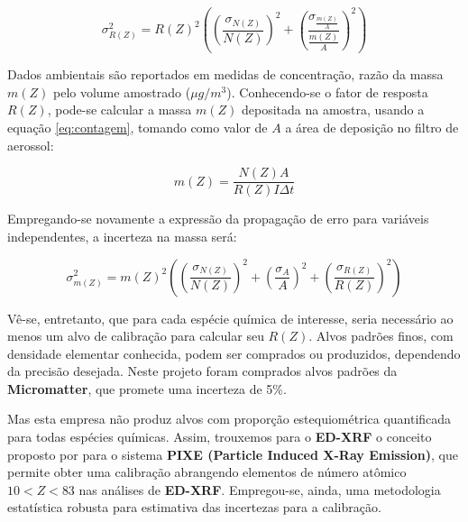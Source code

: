 \begin{equation}
  \label{eq:erro_fator_de_resposta}
  \sigma_{R(Z)}^2 = {R(Z)}^2 \left( \left(\frac{\sigma_{N(Z)}}{N(Z)}\right)^2 + 
                                  \left(\frac{\sigma_\frac{m(Z)}{A}}{\frac{m(Z)}{A}}\right)^2 
                             \right)
\end{equation}

Dados ambientais são reportados em medidas de concentração,
razão da massa $m(Z)$ pelo volume amostrado ($\mu g/m^3$).
Conhecendo-se o fator de resposta $R(Z)$, pode-se calcular a massa $m(Z)$ depositada na amostra, usando a equação \ref{eq:contagem}, tomando como valor de $A$ a área de deposição no filtro de aerossol: 

\begin{equation}
  \label{eq:xrfedmassa}
  m(Z) = \frac{N(Z) A}{ R(Z)I \Delta t}
\end{equation}

Empregando-se novamente a expressão da propagação de erro para variáveis independentes, 
a incerteza na massa será:

\begin{equation}
  \label{eq:erro_massa}
  \sigma_{m(Z)}^2 = {m(Z)}^2 \left( \left(\frac{\sigma_{N(Z)}}{N(Z)}\right)^2 + 
                                  \left(\frac{\sigma_A}{A}\right)^2 + 
                                  \left(\frac{\sigma_{R(Z)}}{R(Z)}\right)^2 
                             \right)
\end{equation}


Vê-se, entretanto, que para cada espécie química de interesse, seria necessário ao menos um alvo de calibração para calcular seu $R(Z)$. Alvos padrões finos, com densidade elementar conhecida, podem ser comprados ou produzidos, dependendo da precisão desejada. Neste projeto foram comprados alvos padrões da \textbf{Micromatter}, que promete uma incerteza de 5\%.

Mas esta empresa não produz alvos com proporção estequiométrica quantificada para todas espécies químicas.%
%
%
 Assim, trouxemos para o \textbf{ED-XRF} o conceito proposto por \citep{tabacniks2000}
para o sistema \textbf{PIXE (Particle Induced X-Ray Emission)}, que permite obter uma calibração abrangendo elementos de número atômico 
$ 10 < Z < 83$ %
%
%
nas análises de \textbf{ED-XRF}. 
Empregou-se, ainda, uma metodologia estatística robusta para estimativa das incertezas para a calibração.


